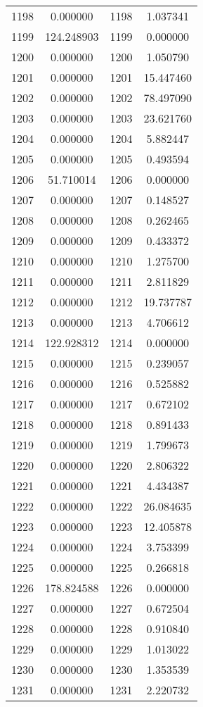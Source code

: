 \documentclass[12pt]{article}
\begin{document}
\begin{longtable}{@{}cccc@{}}
1198 & 0.000000 & 1198 & 1.037341 \\
1199 & 124.248903 & 1199 & 0.000000 \\
1200 & 0.000000 & 1200 & 1.050790 \\
1201 & 0.000000 & 1201 & 15.447460 \\
1202 & 0.000000 & 1202 & 78.497090 \\
1203 & 0.000000 & 1203 & 23.621760 \\
1204 & 0.000000 & 1204 & 5.882447 \\
1205 & 0.000000 & 1205 & 0.493594 \\
1206 & 51.710014 & 1206 & 0.000000 \\
1207 & 0.000000 & 1207 & 0.148527 \\
1208 & 0.000000 & 1208 & 0.262465 \\
1209 & 0.000000 & 1209 & 0.433372 \\
1210 & 0.000000 & 1210 & 1.275700 \\
1211 & 0.000000 & 1211 & 2.811829 \\
1212 & 0.000000 & 1212 & 19.737787 \\
1213 & 0.000000 & 1213 & 4.706612 \\
1214 & 122.928312 & 1214 & 0.000000 \\
1215 & 0.000000 & 1215 & 0.239057 \\
1216 & 0.000000 & 1216 & 0.525882 \\
1217 & 0.000000 & 1217 & 0.672102 \\
1218 & 0.000000 & 1218 & 0.891433 \\
1219 & 0.000000 & 1219 & 1.799673 \\
1220 & 0.000000 & 1220 & 2.806322 \\
1221 & 0.000000 & 1221 & 4.434387 \\
1222 & 0.000000 & 1222 & 26.084635 \\
1223 & 0.000000 & 1223 & 12.405878 \\
1224 & 0.000000 & 1224 & 3.753399 \\
1225 & 0.000000 & 1225 & 0.266818 \\
1226 & 178.824588 & 1226 & 0.000000 \\
1227 & 0.000000 & 1227 & 0.672504 \\
1228 & 0.000000 & 1228 & 0.910840 \\
1229 & 0.000000 & 1229 & 1.013022 \\
1230 & 0.000000 & 1230 & 1.353539 \\
1231 & 0.000000 & 1231 & 2.220732 \\

\end{longtable}
\end{document}

